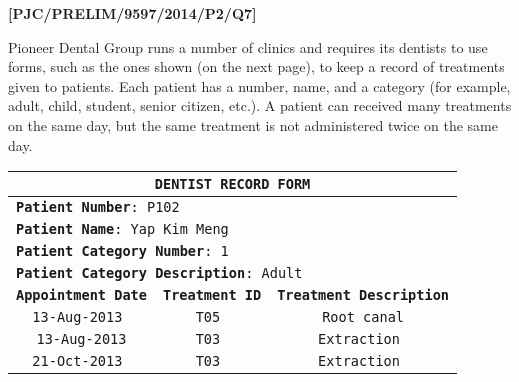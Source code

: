 \item \textbf{{[}PJC/PRELIM/9597/2014/P2/Q7{]} }

Pioneer Dental Group runs a number of clinics and requires its dentists
to use forms, such as the ones shown (on the next page), to keep a
record of treatments given to patients. Each patient has a number,
name, and a category (for example, adult, child, student, senior citizen,
etc.). A patient can received many treatments on the same day, but
the same treatment is not administered twice on the same day. 
\noindent \begin{center}
\begin{tabular}{|c|c|c|}
\hline 
\multicolumn{3}{|c|}{\texttt{\textbf{DENTIST RECORD FORM}}}\tabularnewline
\hline 
\multicolumn{3}{|l|}{\texttt{\textbf{Patient Number}}\texttt{: P102 }}\tabularnewline
\multicolumn{3}{|l|}{\texttt{\textbf{Patient Name}}\texttt{: Yap Kim Meng }}\tabularnewline
\multicolumn{3}{|l|}{\texttt{\textbf{Patient Category Number}}\texttt{: 1 }}\tabularnewline
\multicolumn{3}{|l|}{\texttt{\textbf{Patient Category Description}}\texttt{: Adult}}\tabularnewline
\hline 
\texttt{\textbf{Appointment Date}} & \texttt{\textbf{Treatment ID}} & \texttt{\textbf{Treatment Description}}\tabularnewline
\hline 
\texttt{13-Aug-2013 } & \texttt{T05 } & \texttt{Root canal}\tabularnewline
\hline 
\texttt{13-Aug-2013} & \texttt{T03 } & \texttt{Extraction }\tabularnewline
\hline 
\texttt{21-Oct-2013 } & \texttt{T03 } & \texttt{Extraction }\tabularnewline
\hline 
\end{tabular}
\par\end{center}

